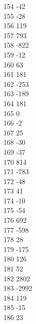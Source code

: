 { 154	-42 \\
 155	-28 \\
 156	119 \\
 157	793 \\
 158	-822 \\
 159	-12 \\
 160	63 \\
 161	181 \\
 162	-253 \\
 163	-189 \\
 164	181 \\
 165	0 \\
 166	-2 \\
 167	25 \\
 168	-30 \\
 169	-37 \\
 170	814 \\
 171	-783 \\
 172	-48 \\
 173	41 \\
 174	-10 \\
 175	-54 \\
 176	692 \\
 177	-598 \\
 178	28 \\
 179	-175 \\
 180	126 \\
 181	52 \\
 182	2802 \\
 183	-2992 \\
 184	119 \\
 185	-15 \\
 186	23 \\
}
